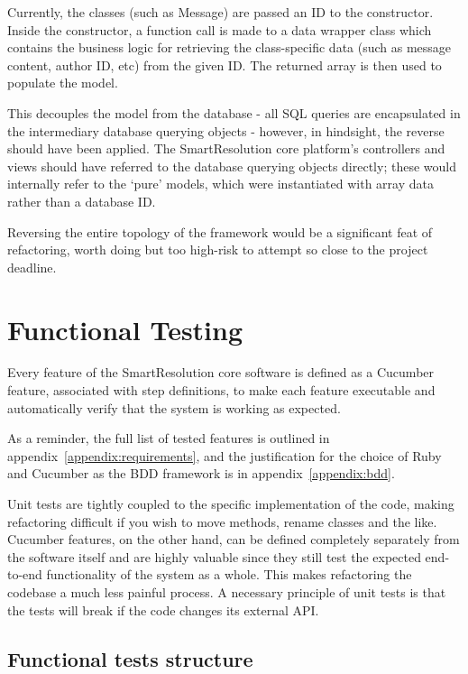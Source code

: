 Currently, the classes (such as Message) are passed an ID to the constructor. Inside the constructor, a function call is made to a data wrapper class which contains the business logic for retrieving the class-specific data (such as message content, author ID, etc) from the given ID. The returned array is then used to populate the model.

This decouples the model from the database - all SQL queries are encapsulated in the intermediary database querying objects - however, in hindsight, the reverse should have been applied. The SmartResolution core platform's controllers and views should have referred to the database querying objects directly; these would internally refer to the `pure' models, which were instantiated with array data rather than a database ID.

Reversing the entire topology of the framework would be a significant feat of refactoring, worth doing but too high-risk to attempt so close to the project deadline.

\section{Functional Testing}

Every feature of the SmartResolution core software is defined as a Cucumber feature, associated with step definitions, to make each feature executable and automatically verify that the system is working as expected.

As a reminder, the full list of tested features is outlined in appendix~\ref{appendix:requirements}, and the justification for the choice of Ruby and Cucumber as the BDD framework is in appendix~\ref{appendix:bdd}.

Unit tests are tightly coupled to the specific implementation of the code, making refactoring difficult if you wish to move methods, rename classes and the like. Cucumber features, on the other hand, can be defined completely separately from the software itself and are highly valuable since they still test the expected end-to-end functionality of the system as a whole. This makes refactoring the codebase a much less painful process. A necessary principle of unit tests is that the tests will break if the code changes its external API.

\subsection{Functional tests structure}

